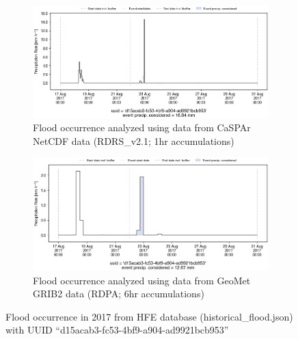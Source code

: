 \documentclass[10pt,a4paper,titlepage,parskip]{scrartcl}
\begin{document}
\begin{figure}[h]
	\begin{subfigure}[a]{1.0\textwidth}
		\centering
		\includegraphics[width=\linewidth]{figures/compare_Geomet_CaSPAr/interpolated_at_stations_occurrence_1009_identified-timesteps_RDRS_v2.1.png}
		\caption{Flood occurrence analyzed using data from CaSPAr NetCDF data (RDRS\_v2.1; 1hr accumulations)}
	\end{subfigure}
	\par\bigskip\bigskip
	\begin{subfigure}[b]{1.0\textwidth}
		\centering
		\includegraphics[width=\linewidth]{figures/compare_Geomet_CaSPAr/interpolated_at_stations_occurrence_1009_identified-timesteps_rdpa_10km_6f.png}
		\caption{Flood occurrence analyzed using data from GeoMet GRIB2 data (RDPA; 6hr accumulations)}
	\end{subfigure}
	\par\bigskip\bigskip
	\caption{Flood occurrence in 2017 from HFE database (historical\_flood.json) with UUID ``d15acab3-fc53-4bf9-a904-ad9921bcb953''}
\end{figure}
\pagebreak
\end{document}
